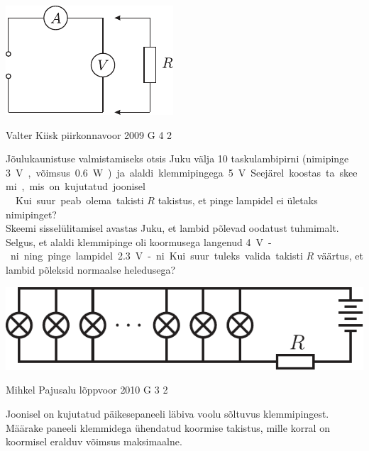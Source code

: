 \documentclass[11pt, twoside]{article}
\begin{document}
{{\begin{center}
	\includegraphics[width=0.5\linewidth]{2006-v3g-01-yl}
\end{center}
\fi
}

{Valter Kiisk} %
{piirkonnavoor} %
{2009} %
{G 4} %
{2} %
{
\ifStatement
Jõulukaunistuse valmistamiseks otsis Juku välja 10
taskulambipirni (nimipinge \SI{3}V, võimsus \SI{0.6}W) ja alaldi klemmipingega \SI{5}V.
Seejärel koostas ta skeemi, mis on kujutatud joonisel.\\
\osa Kui suur peab olema
takisti $R$ takistus, et pinge lampidel ei ületaks nimipinget?\\
\osa Skeemi sisselülitamisel avastas Juku, et lambid põlevad oodatust tuhmimalt. Selgus, et alaldi
klemmipinge oli koormusega langenud \SI{4}V-ni ning pinge lampidel \SI{2,3}V-ni. Kui suur
tuleks valida takisti $R$ väärtus, et lambid põleksid normaalse heledusega?

\begin{center}
	\includegraphics[width=0.8\linewidth]{2009-v2g-04-yl}
\end{center}
\fi
}

{Mihkel Pajusalu} %
{lõppvoor} %
{2010} %
{G 3} %
{2} %
{
\ifStatement
Joonisel on kujutatud päikesepaneeli läbiva voolu sõltuvus klemmipingest.
Määrake paneeli klemmidega ühendatud koormise takistus, mille korral on koormisel eralduv
võimsus maksimaalne.

}}
\end{document}
